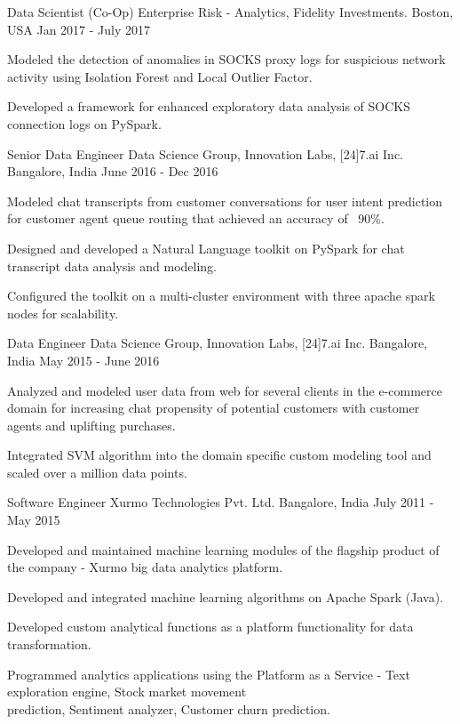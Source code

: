 \begin{cventries}
  \cventry
    {Data Scientist (Co-Op)}
    {Enterprise Risk - Analytics, Fidelity Investments.}
    {Boston, USA}
    {Jan 2017 - July 2017}
    {
      \begin{cvitems}
        \item {Modeled the detection of anomalies in SOCKS proxy logs for suspicious network activity using Isolation Forest and Local Outlier Factor.}
        \item {Developed a framework for enhanced exploratory data analysis of SOCKS connection logs on PySpark.}
      \end{cvitems}
    }
  \cventry
    {Senior Data Engineer}
    {Data Science Group, Innovation Labs, [24]7.ai Inc.}
    {Bangalore, India}
    {June 2016 - Dec 2016}
    {
      \begin{cvitems}
        \item {Modeled chat transcripts from customer conversations for user intent prediction for customer agent queue routing that achieved an accuracy of ~90\%.}
        \item {Designed and developed a Natural Language toolkit on PySpark for chat transcript data analysis and modeling.}
        \item {Configured the toolkit on a multi-cluster environment with three apache spark nodes for scalability.}
      \end{cvitems}
    }
  \cventry
    {Data Engineer}
    {Data Science Group, Innovation Labs, [24]7.ai Inc.}  
    {Bangalore, India}
    {May 2015 - June 2016}
    {
      \begin{cvitems}
        \item {Analyzed and modeled user data from web for several clients in the e-commerce domain for increasing chat propensity of potential customers with customer agents and uplifting purchases.}
        \item {Integrated SVM algorithm into the domain specific custom modeling tool and scaled over a million data points.}
      \end{cvitems}
    }
  \cventry
    {Software Engineer}
    {Xurmo Technologies Pvt. Ltd.}
    {Bangalore, India}
    {July 2011 - May 2015}
    {
      \begin{cvitems}
        \item {Developed and maintained machine learning modules of the flagship product of the company - Xurmo big data analytics platform.}
        \item {Developed and integrated machine learning algorithms on Apache Spark (Java).}
        \item {Developed custom analytical functions as a platform functionality for data transformation.}
        \item {Programmed analytics applications using the Platform as a Service - Text exploration engine, Stock market movement \\ prediction, Sentiment analyzer, Customer churn prediction.}
      \end{cvitems} 
    }
\end{cventries}
